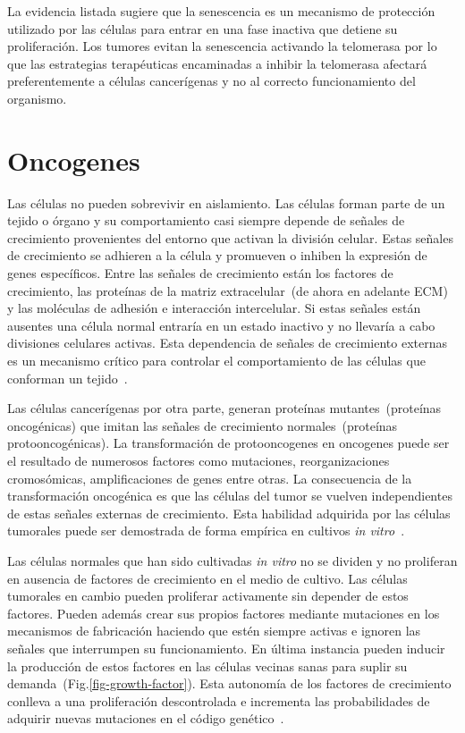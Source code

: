 La evidencia listada sugiere que la senescencia es un mecanismo de protecci\'on utilizado por las c\'elulas para entrar en una fase inactiva que detiene su proliferaci\'on. Los tumores evitan la senescencia activando la telomerasa por lo que las estrategias terap\'euticas encaminadas a inhibir la telomerasa afectar\'a preferentemente a c\'elulas cancer\'igenas y no al correcto funcionamiento del organismo. 

\section{Oncogenes}
\label{subsec-oncogene}
Las c\'elulas no pueden sobrevivir en aislamiento. Las c\'elulas forman parte de un tejido o \'organo y su comportamiento casi siempre depende de se\~nales de crecimiento provenientes del entorno que activan la divisi\'on celular. Estas se\~nales de crecimiento se adhieren a la c\'elula y promueven o inhiben la expresi\'on de genes espec\'ificos. Entre las se\~nales de crecimiento est\'an los factores de crecimiento, las prote\'inas de la matriz extracelular~(de ahora en adelante ECM) y las mol\'eculas de adhesi\'on e interacci\'on intercelular. Si estas se\~nales est\'an ausentes una c\'elula normal entrar\'ia en un estado inactivo y no llevar\'ia a cabo divisiones celulares activas. Esta dependencia de se\~nales de crecimiento externas es un mecanismo cr\'itico para controlar el comportamiento de las c\'elulas que conforman un tejido~\cite{robins,hanahan,cancerbook}. 

Las c\'elulas cancer\'igenas por otra parte, generan prote\'inas mutantes~(prote\'inas oncog\'enicas) que imitan las se\~nales de crecimiento normales~(prote\'inas protooncog\'enicas). La transformaci\'on de protooncogenes en oncogenes puede ser el resultado de numerosos factores como mutaciones, reorganizaciones cromos\'omicas, amplificaciones de genes entre otras. La consecuencia de la transformaci\'on oncog\'enica es que las c\'elulas del tumor se vuelven independientes de estas se\~nales externas de crecimiento. Esta habilidad adquirida por las c\'elulas tumorales puede ser demostrada de forma emp\'irica en cultivos \textit{in vitro}~\cite{robins,hanahan,cancerbook}.

Las c\'elulas normales que han sido cultivadas \textit{in vitro} no se dividen y no proliferan en ausencia de factores de crecimiento en el medio de cultivo. Las c\'elulas tumorales en cambio pueden proliferar activamente sin depender de estos factores. Pueden adem\'as crear sus propios factores mediante mutaciones en los mecanismos de fabricaci\'on haciendo que est\'en siempre activas e ignoren las se\~nales que interrumpen su funcionamiento. En \'ultima instancia pueden inducir la producci\'on de estos factores en las c\'elulas vecinas sanas para suplir su demanda~(Fig.\ref{fig-growth-factor}). Esta autonom\'ia de los factores de crecimiento conlleva a una proliferaci\'on descontrolada e incrementa las probabilidades de adquirir nuevas mutaciones en el c\'odigo gen\'etico~\cite{robins,hanahan,cancerbook}.

